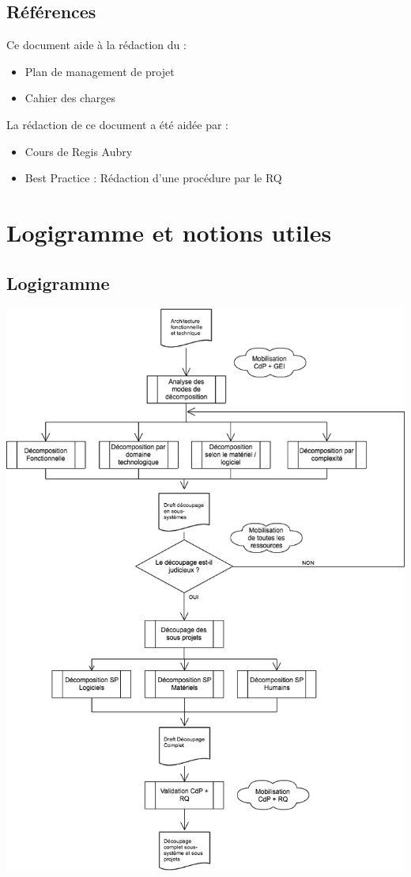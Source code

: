 \subsection{Références}
Ce document aide à la rédaction du :
\begin{itemize}
\item Plan de management de projet
\item Cahier des charges
\end{itemize}
La rédaction de ce document a été aidée par :
\begin{itemize}
\item Cours de Regis Aubry
\item Best Practice : Rédaction d'une procédure par le RQ
\end{itemize}


\section{Logigramme et notions utiles}
\subsection{Logigramme}
\begin {center}
\includegraphics[width=\textwidth]{png/DecompositionSousSystem.png}
\end {center}

